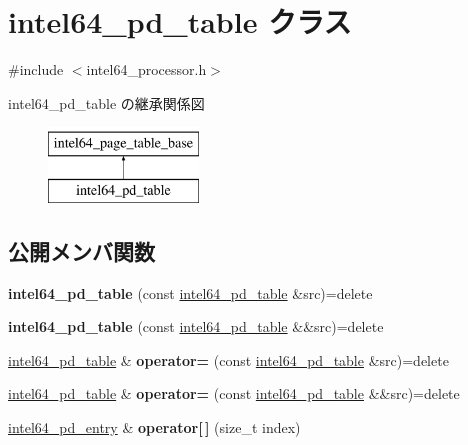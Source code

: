 \hypertarget{classintel64__pd__table}{}\section{intel64\+\_\+pd\+\_\+table クラス}
\label{classintel64__pd__table}


{\ttfamily \#include $<$intel64\+\_\+processor.\+h$>$}

intel64\+\_\+pd\+\_\+table の継承関係図\begin{figure}[H]
\begin{center}
\leavevmode
\includegraphics[height=2.000000cm]{classintel64__pd__table}
\end{center}
\end{figure}
\subsection*{公開メンバ関数}
\begin{DoxyCompactItemize}
\item 
\hypertarget{classintel64__pd__table_a5d230d6f3d9805067cd03448c4cabe70}{}{\bfseries intel64\+\_\+pd\+\_\+table} (const \hyperlink{classintel64__pd__table}{intel64\+\_\+pd\+\_\+table} \&src)=delete\label{classintel64__pd__table_a5d230d6f3d9805067cd03448c4cabe70}

\item 
\hypertarget{classintel64__pd__table_af79d6dd14067f953869cc165536745cd}{}{\bfseries intel64\+\_\+pd\+\_\+table} (const \hyperlink{classintel64__pd__table}{intel64\+\_\+pd\+\_\+table} \&\&src)=delete\label{classintel64__pd__table_af79d6dd14067f953869cc165536745cd}

\item 
\hypertarget{classintel64__pd__table_a2bb0f697a15f803d293d52469c5dae63}{}\hyperlink{classintel64__pd__table}{intel64\+\_\+pd\+\_\+table} \& {\bfseries operator=} (const \hyperlink{classintel64__pd__table}{intel64\+\_\+pd\+\_\+table} \&src)=delete\label{classintel64__pd__table_a2bb0f697a15f803d293d52469c5dae63}

\item 
\hypertarget{classintel64__pd__table_a710a1060b39340cc9c12dcfd1e84f117}{}\hyperlink{classintel64__pd__table}{intel64\+\_\+pd\+\_\+table} \& {\bfseries operator=} (const \hyperlink{classintel64__pd__table}{intel64\+\_\+pd\+\_\+table} \&\&src)=delete\label{classintel64__pd__table_a710a1060b39340cc9c12dcfd1e84f117}

\item 
\hypertarget{classintel64__pd__table_a2c0cde90090190585aa6781573ba99a2}{}\hyperlink{classintel64__pd__entry}{intel64\+\_\+pd\+\_\+entry} \& {\bfseries operator\mbox{[}$\,$\mbox{]}} (size\+\_\+t index)\label{classintel64__pd__table_a2c0cde90090190585aa6781573ba99a2}

\end{DoxyCompactItemize}
